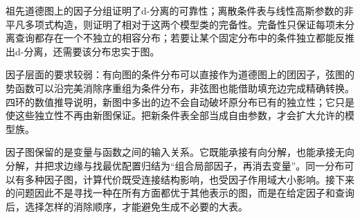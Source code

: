 祖先道德图上的因子分组证明了d-分离的可靠性；离散条件表与线性高斯参数的非平凡多项式构造，则证明了相对于这两个模型类的完备性。完备性只保证每项未分离查询都存在一个不独立的相容分布；若要让某个固定分布中的条件独立都能反推出d-分离，还需要该分布忠实于图。

因子层面的要求较弱：有向图的条件分布可以直接作为道德图上的团因子，弦图的势函数可以沿完美消除序重组为条件分布，非弦图也能借助填充边完成精确转换。四环的数值推导说明，新图中多出的边不会自动破坏原分布已有的独立性；它只是使这些独立性不再由新图保证。把新条件表全部当成自由参数，才会扩大允许的模型族。

因子图保留的是变量与函数之间的输入关系。它既能承接有向分解，也能承接无向分解，并把求边缘与找最优配置归结为“组合局部因子，再消去变量”。同一分布可以有多种因子图，计算代价既受连接结构影响，也受因子作用域大小影响。接下来的问题因此不是寻找一种在所有方面都优于其他表示的图，而是在给定因子和查询后，选择怎样的消除顺序，才能避免生成不必要的大表。
